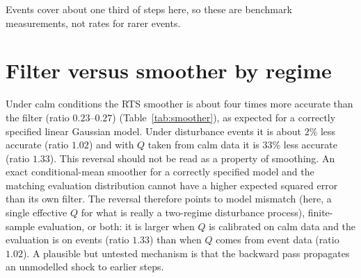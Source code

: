 \documentclass[conference]{IEEEtran}
\begin{document}
\begin{table}[t]
\centering
\caption{ROC AUC for event-active steps, by event type (calm steps as negatives).}
\label{tab:events}
\small
\setlength{\tabcolsep}{3pt}
\end{table}

Events cover about one third of steps here, so these are benchmark measurements, not rates for rarer events.

\section{Filter versus smoother by regime}
\label{sec:smoother}

Under calm conditions the RTS smoother is about four times more accurate than the filter (ratio $0.23$--$0.27$) (Table~\ref{tab:smoother}), as expected for a correctly specified linear Gaussian model. Under disturbance events it is about $2\%$ less accurate (ratio $1.02$) and with $Q$ taken from calm data it is $33\%$ less accurate (ratio $1.33$). This reversal should not be read as a property of smoothing. An exact conditional-mean smoother for a correctly specified model and the matching evaluation distribution cannot have a higher expected squared error than its own filter. The reversal therefore points to model mismatch (here, a single effective $Q$ for what is really a two-regime disturbance process), finite-sample evaluation, or both: it is larger when $Q$ is calibrated on calm data and the evaluation is on events (ratio $1.33$) than when $Q$ comes from event data (ratio $1.02$). A plausible but untested mechanism is that the backward pass propagates an unmodelled shock to earlier steps.

\begin{table}[t]
\centering
\caption{Kalman filter and RTS smoother by regime (300 trajectories each; events at rate $0.08$).}
\label{tab:smoother}
\small
{}
\end{table}
\end{document}
